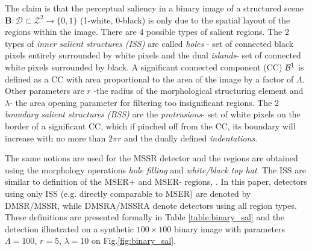 \documentclass{article}
\def\B{{\mathbf B}}
\def\mcD{{\mathcal{D}}}
\begin{document}
The claim is that the perceptual saliency in a binary image of a structured scene 
 $\B: \mcD \subset \mathcal{Z}^2 \rightarrow \{0,1\}$ (1-white, 0-black)
is only due to the spatial layout of the regions within the image. 
There are  $4$ possible types of salient regions. The $2$ types of {\em inner salient structures (ISS)} are called {\em holes} - set of connected black pixels entirely surrounded by white pixels and the dual {\em islands}- set of connected white pixels surrounded by black. A significant connected component (CC) ${\cal B}^1$ is defined as a CC with area proportional to the area
of the image by a factor of $\Lambda$. Other parameters are $r$ -the radius of the morphological structuring element and $\lambda$- the area opening parameter for filtering too insignificant regions. The $2$ {\em boundary salient structures (BSS)} are the {\em protrusions}- set of white pixels on the border of a significant CC, which if pinched off from the CC, its boundary will increase with no more than $2\pi r$ and the dually defined {\em indentations}. 

The same notions are used for the MSSR detector and the regions are obtained using the morphology operations {\em hole filling} and {\em white/black top hat}. The ISS are similar to definition of the MSER+ and MSER- regions, \cite{Matas2002BMVC}. In this paper, detectors using only ISS (e.g. directly comparable to MSER) are denoted by DMSR/MSSR, while DMSRA/MSSRA denote detectors using all region types. These definitions are presented formally in Table \ref{table:binary_sal} and the detection illustrated on a synthetic $100 \times 100$ binary image with parameters $\Lambda=100$, $r=5$, $\lambda = 10$ on Fig.\ref{fig:binary_sal}.
\end{document}
